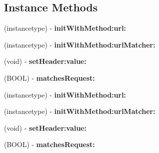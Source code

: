 \subsection*{Instance Methods}
\begin{DoxyCompactItemize}
\item 
\hypertarget{interface_l_s_stub_request_a9e45ad7ac3f31e6bcf529e065339c36c}{(instancetype) -\/ {\bfseries init\-With\-Method\-:url\-:}}\label{interface_l_s_stub_request_a9e45ad7ac3f31e6bcf529e065339c36c}

\item 
\hypertarget{interface_l_s_stub_request_a5f3bd9ba32ac59120b184c21ada1de96}{(instancetype) -\/ {\bfseries init\-With\-Method\-:url\-Matcher\-:}}\label{interface_l_s_stub_request_a5f3bd9ba32ac59120b184c21ada1de96}

\item 
\hypertarget{interface_l_s_stub_request_a4692437665e9f564bc129b48561dc695}{(void) -\/ {\bfseries set\-Header\-:value\-:}}\label{interface_l_s_stub_request_a4692437665e9f564bc129b48561dc695}

\item 
\hypertarget{interface_l_s_stub_request_af01628995052a65f8c64fbe73a971431}{(B\-O\-O\-L) -\/ {\bfseries matches\-Request\-:}}\label{interface_l_s_stub_request_af01628995052a65f8c64fbe73a971431}

\item 
\hypertarget{interface_l_s_stub_request_a9e45ad7ac3f31e6bcf529e065339c36c}{(instancetype) -\/ {\bfseries init\-With\-Method\-:url\-:}}\label{interface_l_s_stub_request_a9e45ad7ac3f31e6bcf529e065339c36c}

\item 
\hypertarget{interface_l_s_stub_request_a5f3bd9ba32ac59120b184c21ada1de96}{(instancetype) -\/ {\bfseries init\-With\-Method\-:url\-Matcher\-:}}\label{interface_l_s_stub_request_a5f3bd9ba32ac59120b184c21ada1de96}

\item 
\hypertarget{interface_l_s_stub_request_a4692437665e9f564bc129b48561dc695}{(void) -\/ {\bfseries set\-Header\-:value\-:}}\label{interface_l_s_stub_request_a4692437665e9f564bc129b48561dc695}

\item 
\hypertarget{interface_l_s_stub_request_af01628995052a65f8c64fbe73a971431}{(B\-O\-O\-L) -\/ {\bfseries matches\-Request\-:}}\label{interface_l_s_stub_request_af01628995052a65f8c64fbe73a971431}

\end{DoxyCompactItemize}
